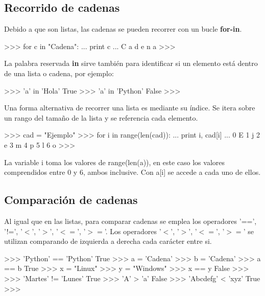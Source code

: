 \subsection{Recorrido de cadenas}

Debido a que son listas, las cadenas se pueden recorrer con un bucle \textbf{for-in}.\\

\begin{pyglist} [language=python]
>>> for c in "Cadena":
...     print c
... 
C
a
d
e
n
a
>>>
\end{pyglist}

La palabra reservada \textbf{in} sirve también para identificar si un elemento está dentro de una lista o cadena, por ejemplo:\\

\begin{pyglist} [language=python]
>>> 'a' in 'Hola'
True
>>> 'a' in 'Python'
False
>>> 
\end{pyglist}

Una forma alternativa de recorrer una lista es mediante su índice. Se itera sobre un rango del tamaño de la lista y se referencia cada elemento.\\

\begin{pyglist} [language=python]
>>> cad = "Ejemplo"
>>> for i in range(len(cad)):
...     print i, cad[i]
... 
0 E
1 j
2 e
3 m
4 p
5 l
6 o
>>> 
\end{pyglist}

La variable i toma los valores de range(len(a)), en este caso los valores comprendidos entre 0 y 6, ambos inclusive. Con a[i] se accede a cada uno de ellos.

\subsection{Comparación de cadenas}

Al igual que en las listas, para comparar cadenas se emplea los operadores '==', '!=', '$<$', '$>$', '$<=$', '$>=$'. Los operadores  '$<$', '$>$', '$<=$', '$>=$' se utilizan comparando de izquierda a derecha cada carácter entre si.\\

\begin{pyglist} [language=python]
>>> 'Python' == 'Python'
True
>>> a = 'Cadena'
>>> b = 'Cadena'
>>> a == b
True
>>> x = "Linux"
>>> y = "Windows"
>>> x == y
False
>>> 
>>> 'Martes' != 'Lunes'
True
>>> 'A' > 'a'
False
>>> 'Abcdefg' < 'xyz'
True
>>> 
\end{pyglist}



